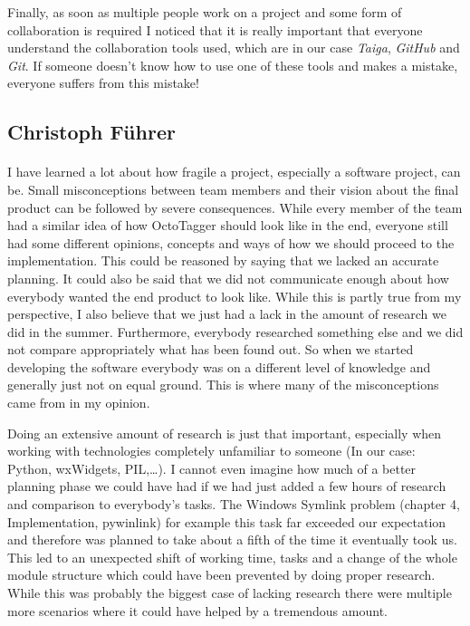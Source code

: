 Finally, as soon as multiple people work on a project and some form of
collaboration is required I noticed that it is really important that everyone
understand the collaboration tools used, which are in our case \emph{Taiga},
\emph{GitHub} and \emph{Git}. If someone doesn't know how to use one of
these tools and makes a mistake, everyone suffers from this mistake!

\subsection{Christoph Führer}

\paragraph{}
I have learned a lot about how fragile a project, especially a software project, can be. Small misconceptions between team members and their vision about the final product can be followed by severe consequences. While every member of the team had a similar idea of how OctoTagger should look like in the end, everyone still had some different opinions, concepts and ways of how we should proceed to the implementation. This could be reasoned by saying that we lacked an accurate planning. It could also be said that we did not communicate enough about how everybody wanted the end product to look like. While this is partly true from my perspective, I also believe that we just had a lack in the amount of research we did in the summer. Furthermore, everybody researched something else and we did not compare appropriately what has been found out. So when we started developing the software everybody was on a different level of knowledge and generally just not on equal ground. This is where many of the misconceptions came from in my opinion.  

Doing an extensive amount of research is just that important, especially when working with technologies completely unfamiliar to someone (In our case: Python, wxWidgets, PIL,\ldots). I cannot even imagine how much of a better planning phase we could have had if we had just added a few hours of research and comparison to everybody's tasks. The Windows Symlink problem (chapter 4, Implementation, pywinlink) for example this task far exceeded our expectation and therefore was planned to take about a fifth of the time it eventually took us. This led to an unexpected shift of working time, tasks and a change of the whole module structure which could have been prevented by doing proper research. While this was probably the biggest case of lacking research there were multiple more scenarios where it could have helped by a tremendous amount.

